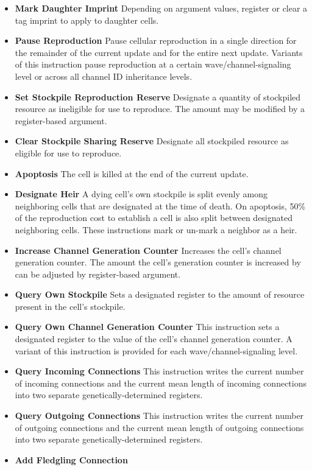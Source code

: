 \begin{itemize}
\item \textbf{Mark Daughter Imprint}
Depending on argument values, register or clear a tag imprint to apply to daughter cells.
\item \textbf{Pause Reproduction}
Pause cellular reproduction in a single direction for the remainder of the current update and for the entire next update.
Variants of this instruction pause reproduction at a certain wave/channel-signaling level or across all channel ID inheritance levels.
\item \textbf{Set Stockpile Reproduction Reserve}
Designate a quantity of stockpiled resource as ineligible for use to reproduce.
The amount may be modified by a register-based argument.
\item \textbf{Clear Stockpile Sharing Reserve}
Designate all stockpiled resource as eligible for use to reproduce.
\item \textbf{Apoptosis}
The cell is killed at the end of the current update.
\item \textbf{Designate Heir} A dying cell's own stockpile is split evenly among neighboring cells that are designated at the time of death.
On apoptosis, 50\% of the reproduction cost to establish a cell is also split between designated neighboring cells.
These instructions mark or un-mark a neighbor as a heir.
\item \textbf{Increase Channel Generation Counter}
Increases the cell's channel generation counter.
The amount the cell's generation counter is increased by can be adjusted by register-based argument.
\item \textbf{Query Own Stockpile}
Sets a designated register to the amount of resource present in the cell's stockpile.
\item \textbf{Query Own Channel Generation Counter}
This instruction sets a designated register to the value of the cell's channel generation counter.
A variant of this instruction is provided for each wave/channel-signaling level.
\item \textbf{Query Incoming Connections}
This instruction writes the current number of incoming connections and the current mean length of incoming connections into two separate genetically-determined registers.
\item \textbf{Query Outgoing Connections}
This instruction writes the current number of outgoing connections and the current mean length of outgoing connections into two separate genetically-determined registers.
\item \textbf{Add Fledgling Connection}

\end{itemize}
